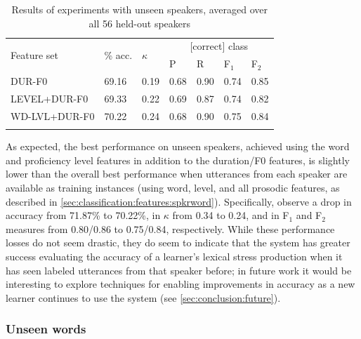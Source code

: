 	
	\begin{table}
			\centering
			\caption[Results of experiments with unseen speakers]{Results of experiments with unseen speakers, averaged over all 56 held-out speakers   }
			\begin{tabularx}{\textwidth}{lXXXXXX}			
			\toprule
			\multirow{2}{*}{Feature set} & \multirow{2}{*}{\% acc.} & \multirow{2}{*}{$\kappa$} & \multicolumn{4}{c}{[correct] class} \\
			\cmidrule(lr){4-7}
			& & & P & R & F$_1$ & F$_2$ \\
			\midrule
DUR-F0	&	69.16	&	0.19	&	0.68	&	0.90	&	0.74	&	0.85	\\
{LEVEL+DUR-F0}	&	69.33	&	0.22	&	0.69	&	0.87	&	0.74	&	0.82	\\
{WD-LVL+DUR-F0}	&	70.22	&	0.24	&	0.68	&	0.90	&	0.75	&	0.84	\\							
			\bottomrule
			\label{tab:results:speakers}
			\end{tabularx}
		\end{table}
		
		As expected, the best performance on unseen speakers, achieved using the word and proficiency level features in addition to the duration/F0 features, is slightly lower than the overall best performance when utterances from each speaker are available as training instances (using word, level, and all prosodic features, as described in \cref{sec:classification:features:spkrword}). Specifically,  observe a drop in accuracy from 71.87\% to 70.22\%, in $\kappa$ from 0.34 to 0.24, and in F$_1$ and F$_2$ measures from 0.80/0.86 to 0.75/0.84, respectively. While these performance losses do not seem drastic, they do seem to indicate that the system has greater success evaluating the accuracy of a learner's lexical stress production when it has seen  labeled utterances from that speaker before; in future work it would be interesting to explore techniques for enabling improvements in accuracy as a new learner continues to use the system (see \cref{sec:conclusion:future}).
		
		
		
		\subsubsection{Unseen words}
	
